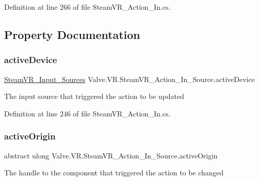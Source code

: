 Definition at line 266 of file Steam\+V\+R\+\_\+\+Action\+\_\+\+In.\+cs.



\subsection{Property Documentation}
\mbox{\label{class_valve_1_1_v_r_1_1_steam_v_r___action___in___source_acc6d38cc8824491cc45e809fa92922dc}} 
\subsubsection{\texorpdfstring{activeDevice}{activeDevice}}
{\footnotesize\ttfamily \mbox{\hyperlink{namespace_valve_1_1_v_r_a82e5bf501cc3aa155444ee3f0662853f}{Steam\+V\+R\+\_\+\+Input\+\_\+\+Sources}} Valve.\+V\+R.\+Steam\+V\+R\+\_\+\+Action\+\_\+\+In\+\_\+\+Source.\+active\+Device\hspace{0.3cm}{\ttfamily [get]}}



The input source that triggered the action to be updated 



Definition at line 246 of file Steam\+V\+R\+\_\+\+Action\+\_\+\+In.\+cs.

\mbox{\label{class_valve_1_1_v_r_1_1_steam_v_r___action___in___source_a1e92c5acceb5d145b96b263d679fb5ee}} 
\subsubsection{\texorpdfstring{activeOrigin}{activeOrigin}}
{\footnotesize\ttfamily abstract ulong Valve.\+V\+R.\+Steam\+V\+R\+\_\+\+Action\+\_\+\+In\+\_\+\+Source.\+active\+Origin\hspace{0.3cm}{\ttfamily [get]}}



The handle to the component that triggered the action to be changed 



